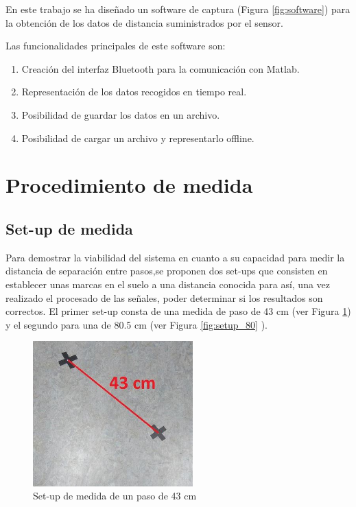 		En este trabajo se ha diseñado un software de captura (Figura \ref{fig:software}) para la obtención de los datos de distancia suministrados por el sensor.
		

		Las funcionalidades principales de este software son:
		\begin{enumerate}
				\item Creación del interfaz Bluetooth para la comunicación con Matlab. 
				\item Representación de los datos recogidos en tiempo real.
				\item Posibilidad de guardar los datos en un archivo.
				\item Posibilidad de cargar un archivo y representarlo offline.
		\end{enumerate}
	
		
\section{Procedimiento de medida}		

\subsection{Set-up de medida}
Para demostrar la viabilidad del sistema en cuanto a su capacidad para medir la distancia de separación entre pasos,se proponen dos set-ups que consisten en establecer unas marcas en el suelo a una distancia conocida para así, una vez realizado el procesado de las señales, poder determinar si los resultados son correctos. El primer set-up consta de una medida de paso de 43 cm (ver Figura \ref{fig:setup_43}) y el segundo para una de 80.5 cm (ver Figura  \ref{fig:setup_80} ). 

\begin{figure}[H]
	\centering
	\includegraphics[width=0.55\textwidth]{./graphics/setup_43}
	\caption{Set-up de medida de un paso de 43 cm} \label{fig:setup_43}
\end{figure}

